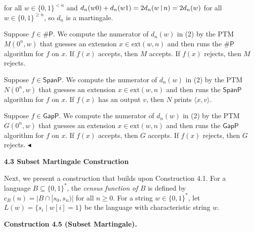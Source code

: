 \documentclass[10pt,a4paper]{article}
\begin{document}
for all $w\in\{0,1\}^{<n}$ and $d_{n}(w0)+d_{n}(w1)=2d_{n}(w\negthinspace\upharpoonright\negthinspace n)=2d_{n}(w)$ for all $w\in\{0,1\}^{\geq n}$, so $d_{n}$ is a martingale.\par




Suppose $f\in{\mathsf{\#}\mathsf{P}}$. We compute the numerator of $d_{n}(w)$ in (2) by the PTM $M(0^{n},w)$ that guesses an extension $x\in\mathrm{ext}(w,n)$ and then runs the ${\mathsf{\#}\mathsf{P}}$ algorithm for $f$ on $x$. If $f(x)$ accepts, then $M$ accepts. If $f(x)$ rejects, then $M$ rejects.\par




Suppose $f\in\mathsf{SpanP}$. We compute the numerator of $d_{n}(w)$ in (2) by the PTM $N(0^{n},w)$ that guesses an extension $x\in\mathrm{ext}(w,n)$ and then runs the $\mathsf{SpanP}$ algorithm for $f$ on $x$. If $f(x)$ has an output $v$, then $N$ prints $\langle x,v\rangle$.\par




Suppose $f\in\mathsf{GapP}$. We compute the numerator of $d_{n}(w)$ in (2) by the PTM $G(0^{n},w)$ that guesses an extension $x\in\mathrm{ext}(w,n)$ and then runs the $\mathsf{GapP}$ algorithm for $f$ on $x$. If $f(x)$ accepts, then $G$ accepts. If $f(x)$ rejects, then $G$ rejects.
$\blacktriangleleft$\par






\par\medskip\noindent\textbf{
4.3 Subset Martingale Construction}\par




Next, we present a construction that builds upon Construction 4.1.
For a language $B\subseteq\{0,1\}^{*}$, the \emph{census function of $B$} is defined by $c_{B}(n)=|B\cap[s_{0},s_{n})|$ for all $n\geq 0$. For a string $w\in\{0,1\}^{*}$, let $L(w)=\{s_{i}\mid w[i]=1\}$ be the language with characteristic string $w$.\par





\par\medskip\noindent\textbf{
\textbf{Construction 4.5}\textbf{ }(Subset Martingale)\textbf{.}
}\par
\end{document}
